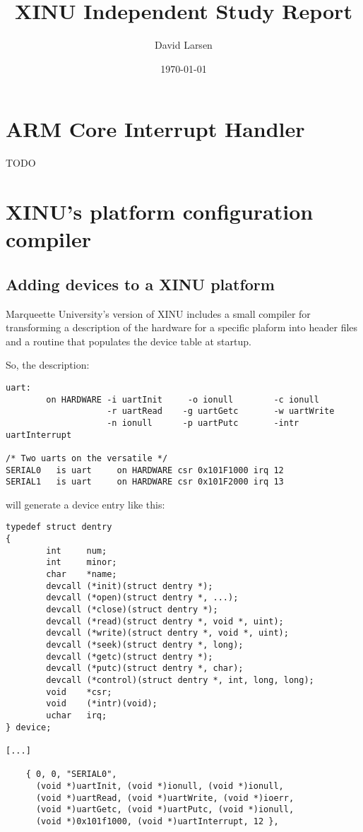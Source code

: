 \documentclass[12pt]{article}
\title{XINU Independent Study Report}
\author{David Larsen}
\date{\today}
\newcommand{\TODO}[1]{{\huge\color{red}TODO \Large #1}}
\begin{document}
\maketitle

\tableofcontents

\section{ARM Core Interrupt Handler}

\TODO{}

\section{XINU's platform configuration compiler}

\subsection{Adding devices to a XINU platform}

Marqueette University's version of XINU includes a small compiler for
transforming a description of the hardware for a specific plaform into header
files and a routine that populates the device table at startup.

So, the description:

\begin{verbatim}
uart:
        on HARDWARE -i uartInit     -o ionull        -c ionull
                    -r uartRead    -g uartGetc       -w uartWrite 
                    -n ionull      -p uartPutc       -intr uartInterrupt

/* Two uarts on the versatile */
SERIAL0   is uart     on HARDWARE csr 0x101F1000 irq 12
SERIAL1   is uart     on HARDWARE csr 0x101F2000 irq 13
\end{verbatim}

will generate a device entry like this:

\begin{verbatim}
typedef struct dentry
{
        int     num;
        int     minor;
        char    *name;
        devcall (*init)(struct dentry *);
        devcall (*open)(struct dentry *, ...);
        devcall (*close)(struct dentry *);
        devcall (*read)(struct dentry *, void *, uint);
        devcall (*write)(struct dentry *, void *, uint);
        devcall (*seek)(struct dentry *, long);
        devcall (*getc)(struct dentry *);
        devcall (*putc)(struct dentry *, char);
        devcall (*control)(struct dentry *, int, long, long);
        void    *csr;
        void    (*intr)(void);
        uchar   irq;
} device;

[...]

	{ 0, 0, "SERIAL0",
	  (void *)uartInit, (void *)ionull, (void *)ionull,
	  (void *)uartRead, (void *)uartWrite, (void *)ioerr,
	  (void *)uartGetc, (void *)uartPutc, (void *)ionull,
	  (void *)0x101f1000, (void *)uartInterrupt, 12 },
\end{verbatim}
\end{document}
